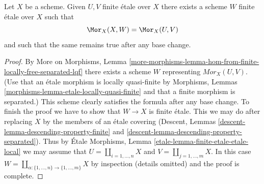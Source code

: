 \begin{lemma}
\label{lemma-internal-hom-finite-etale}
Let $X$ be a scheme. Given $U, V$ finite \'etale over $X$ there
exists a scheme $W$ finite \'etale over $X$ such that
$$
\Mor_X(X, W) = \Mor_X(U, V)
$$
and such that the same remains true after any base change.
\end{lemma}

\begin{proof}
By More on Morphisms, Lemma
\ref{more-morphisms-lemma-hom-from-finite-locally-free-separated-lqf}
there exists a scheme $W$ representing $\mathit{Mor}_X(U, V)$.
(Use that an \'etale morphism is locally quasi-finite by
Morphisms, Lemmas \ref{morphisms-lemma-etale-locally-quasi-finite}
and that a finite morphism is separated.)
This scheme clearly satisfies the formula after any base change.
To finish the proof we have to show that $W \to X$ is finite \'etale.
This we may do after replacing $X$ by the members of an \'etale
covering (Descent, Lemmas \ref{descent-lemma-descending-property-finite}
and \ref{descent-lemma-descending-property-separated}).
Thus by \'Etale Morphisms, Lemma \ref{etale-lemma-finite-etale-etale-local}
we may assume that $U = \coprod_{i = 1, \ldots, n} X$
and $V = \coprod_{j = 1, \ldots, m} X$.
In this case
$W = \coprod_{\alpha : \{1, \ldots, n\} \to \{1, \ldots, m\}} X$
by inspection (details omitted) and the proof is complete.
\end{proof}
